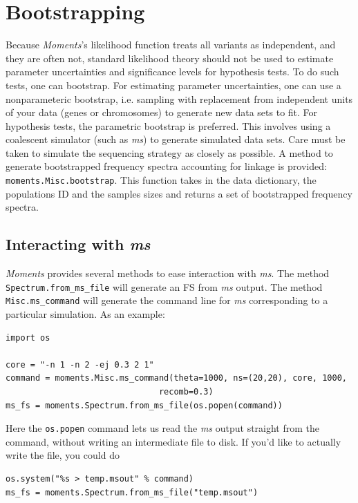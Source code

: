 \documentclass[12pt]{article}
\makeatletter
\newcommand{\ms}{\emph{ms}\xspace}
\newcommand{\py}[1]{\lstinline[language=Python, showstringspaces=False]@#1@}
\makeatother
\begin{document}
\section{Bootstrapping}

Because \textit{Moments}'s likelihood function treats all variants as independent, and they are often not, standard likelihood theory should not be used to estimate parameter uncertainties and significance levels for hypothesis tests.
To do such tests, one can bootstrap.
For estimating parameter uncertainties, one can use a nonparameteric bootstrap, i.e. sampling with replacement from independent units of your data (genes or chromosomes) to generate new data sets to fit.
For hypothesis tests, the parametric bootstrap is preferred.
This involves using a coalescent simulator (such as \ms) to generate simulated data sets.
Care must be taken to simulate the sequencing strategy as closely as possible.
A method to generate bootstrapped frequency spectra accounting for linkage is provided: \py{moments.Misc.bootstrap}. This function takes in the data dictionary, the populations ID and the samples sizes and returns a set of bootstrapped frequency spectra.

\subsection{Interacting with \ms}

\textit{Moments} provides several methods to ease interaction with \ms.
The method \py{Spectrum.from_ms_file} will generate an FS from \ms output.
The method \py{Misc.ms_command} will generate the command line for \ms corresponding to a particular simulation.
As an example:
\begin{lstlisting}
import os

core = "-n 1 -n 2 -ej 0.3 2 1"
command = moments.Misc.ms_command(theta=1000, ns=(20,20), core, 1000,
                               recomb=0.3)
ms_fs = moments.Spectrum.from_ms_file(os.popen(command))
\end{lstlisting}
Here the \py{os.popen} command lets us read the \ms output straight from the command, without writing an intermediate file to disk.
If you'd like to actually write the file, you could do
\begin{lstlisting}
os.system("%s > temp.msout" % command)
ms_fs = moments.Spectrum.from_ms_file("temp.msout")
\end{lstlisting}
\end{document}
